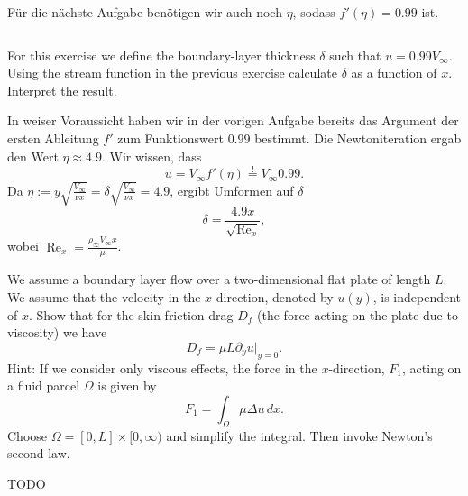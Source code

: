 \documentclass[12pt]{exam}
\newcommand{\del}{\partial}
\begin{document}
\begin{questions}
\begin{solution}
    Für die nächste Aufgabe benötigen wir auch noch $\eta$, sodass $f'(\eta) = 0.99$ ist.
    \inputminted[breaklines, fontsize=\small, firstline=29, lastline=33]{python}{blasius_equation.py}
    \end{solution}
    
    
    \question For this exercise we define the boundary-layer thickness $\delta$ such that $u = 0.99 V_{\infty}$. Using the stream function in the previous exercise calculate $\delta$ as a function of $x$. Interpret the result.
    
    \begin{solution}
        In weiser Voraussicht haben wir in der vorigen Aufgabe bereits das Argument der ersten Ableitung $f'$ zum Funktionswert $0.99$ bestimmt. Die Newtoniteration ergab den Wert $\eta \approx 4.9$. Wir wissen, dass 
        \begin{equation*}
            u = V_{\infty} f'(\eta) \overset{!}{=} V_{\infty} 0.99.
        \end{equation*}
        Da $\eta := y \sqrt{\frac{V_{\infty}}{\nu x}} = \delta \sqrt{\frac{V_{\infty}}{\nu x}} = 4.9$, ergibt Umformen auf $\delta$
        \begin{equation*}
            \delta = \frac{4.9 x}{\sqrt{\operatorname{Re}_x}},
        \end{equation*}
        wobei $\operatorname{Re}_x = \frac{\rho_{\infty} V_{\infty} x}{\mu}$.
    \end{solution}
    
    
    \question We assume a boundary layer flow over a two-dimensional flat plate of length $L$. We assume that the velocity in the $x$-direction, denoted by $u(y)$, is independent of $x$. Show that for the skin friction drag $D_f$ (the force acting on the plate due to viscosity) we have
    \begin{equation*}
        D_f = \mu L \del_y u \vert_{y=0}.
    \end{equation*}
    Hint: If we consider only viscous effects, the force in the $x$-direction, $F_1$, acting on a fluid parcel $\Omega$ is given by
    \begin{equation*}
        F_1 = \int_\Omega \mu \Delta u \, dx.
    \end{equation*}
    Choose $\Omega = [0, L] \times [0, \infty)$ and simplify the integral. Then invoke Newton's second law.
    
    \begin{solution}
        {\color{red} TODO}
    \end{solution}
    

\end{questions}
\end{document}
